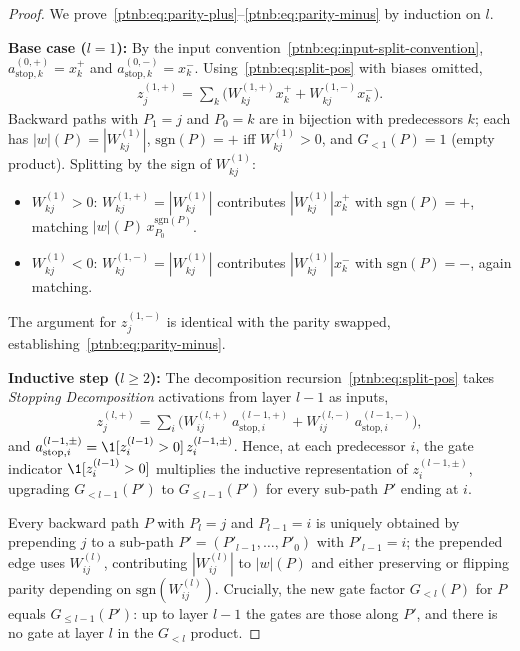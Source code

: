 \begin{proof}
We prove~\eqref{ptnb:eq:parity-plus}--\eqref{ptnb:eq:parity-minus} by induction on $l$.

\textbf{Base case ($l=1$):} By the input convention~\eqref{ptnb:eq:input-split-convention},
$a_{\mathrm{stop},k}^{(0,+)} = x_k^+$ and $a_{\mathrm{stop},k}^{(0,-)} = x_k^-$.
Using~\eqref{ptnb:eq:split-pos} with biases omitted,
\begin{align}
    z_j^{(1,+)}
    = \sum_k \bigl( W_{kj}^{(1,+)} x_k^+ + W_{kj}^{(1,-)} x_k^- \bigr).
\end{align}
Backward paths with $P_1 = j$ and $P_0 = k$ are in bijection with predecessors $k$; each has
$|w|(P) = |W^{(1)}_{kj}|$, $\mathrm{sgn}(P) = +$ iff $W^{(1)}_{kj} > 0$, and $G_{<1}(P) = 1$ (empty
product). Splitting by the sign of $W^{(1)}_{kj}$:
\begin{itemize}
    \item $W^{(1)}_{kj} > 0$: $W_{kj}^{(1,+)} = |W^{(1)}_{kj}|$ contributes $|W^{(1)}_{kj}| x_k^+$ with
        $\mathrm{sgn}(P) = +$, matching $|w|(P)\, x_{P_0}^{\mathrm{sgn}(P)}$.
    \item $W^{(1)}_{kj} < 0$: $W_{kj}^{(1,-)} = |W^{(1)}_{kj}|$ contributes $|W^{(1)}_{kj}| x_k^-$ with
        $\mathrm{sgn}(P) = -$, again matching.
\end{itemize}
The argument for $z_j^{(1,-)}$ is identical with the parity swapped,
establishing~\eqref{ptnb:eq:parity-minus}.

\textbf{Inductive step ($l \ge 2$):} The decomposition recursion~\eqref{ptnb:eq:split-pos} takes
\emph{Stopping Decomposition} activations from layer $l-1$ as inputs,
\begin{align}
    z_j^{(l,+)}
    =
    \sum_i \bigl(
    W_{ij}^{(l,+)}\, a_{\mathrm{stop},i}^{(l-1,+)}
    + W_{ij}^{(l,-)}\, a_{\mathrm{stop},i}^{(l-1,-)}
    \bigr),
\end{align}
and $a_{\mathrm{stop},i}^{(l-1,\pm)} = \1[z_i^{(l-1)} > 0]\, z_i^{(l-1,\pm)}$. Hence, at each
predecessor $i$, the gate indicator $\1[z_i^{(l-1)} > 0]$ multiplies the inductive representation
of $z_i^{(l-1,\pm)}$, upgrading $G_{<l-1}(P')$ to $G_{\le l-1}(P')$ for every sub-path $P'$ ending
at $i$.

Every backward path $P$ with $P_l = j$ and $P_{l-1} = i$ is uniquely obtained by prepending $j$ to
a sub-path $P' = (P'_{l-1}, \dots, P'_0)$ with $P'_{l-1} = i$; the prepended edge uses
$W^{(l)}_{ij}$, contributing $|W^{(l)}_{ij}|$ to $|w|(P)$ and either preserving or flipping parity
depending on $\mathrm{sgn}(W^{(l)}_{ij})$. Crucially, the new gate factor $G_{<l}(P)$ for $P$
equals $G_{\le l-1}(P')$: up to layer $l-1$ the gates are those along $P'$, and there is no gate at
layer $l$ in the $G_{<l}$ product.


\end{proof}
